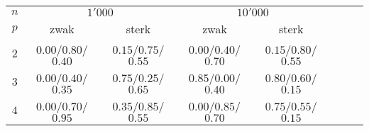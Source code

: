 \begin{tabular}{cccccccc}
\toprule
$n$&\multicolumn{2}{c}{$1'000$}&\multicolumn{2}{c}{$10'000$}\\
$p$&zwak&sterk&zwak&sterk\\\midrule
$2$&$0.00$/$0.80$/$0.40$&$0.15$/$0.75$/$0.55$&$0.00$/$0.40$/$0.70$&$0.15$/$0.80$/$0.55$\\
$3$&$0.00$/$0.40$/$0.35$&$0.75$/$0.25$/$0.65$&$0.85$/$0.00$/$0.40$&$0.80$/$0.60$/$0.15$\\
$4$&$0.00$/$0.70$/$0.95$&$0.35$/$0.85$/$0.55$&$0.00$/$0.85$/$0.70$&$0.75$/$0.55$/$0.15$\\
\bottomrule
\end{tabular}